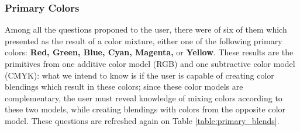 \subsubsection{Primary Colors}
\label{subsubsec:primarycolors}
%
Among all the questions proponed to the user, there were of six of them which presented as the result of a color mixture, either one of the following primary colors: \textbf{Red, Green, Blue, Cyan, Magenta,}
or \textbf{Yellow}. These results are the primitives from one additive color model (RGB) and one subtractive color model (CMYK): what we intend to know is if the user is capable of creating color blendings
which result in these colors; since these color models are complementary, the user must reveal knowledge of mixing colors according to these two models, while creating blendings with colors from the opposite
color model. These questions are refreshed again on Table \ref{table:primary_blends}. \par
%
